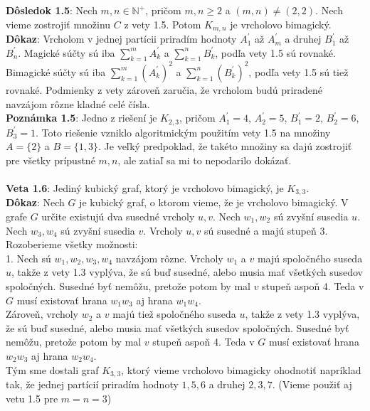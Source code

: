 \documentclass[12pt]{article}
\begin{document}
\textbf{Dôsledok 1.5}:  Nech $m,n \in \mathbb{N^+}$, pričom $m,n \geq 2$ a $(m, n) \neq (2, 2)$. Nech vieme zostrojiť množinu $C$ z vety 1.5. Potom $K _{m,n}$ je vrcholovo bimagický. \\

\textbf{Dôkaz}: Vrcholom v jednej partícii priradím hodnoty $A^\prime_1$ až $A^\prime_m$ a druhej $B^\prime_1$ až $B^\prime_n$. Magické súčty sú iba $\sum_{k=1}^{m} A^\prime_k$ a $\sum_{k=1}^{n} B^\prime_k$, podľa vety 1.5 sú rovnaké. Bimagické súčty sú iba $\sum_{k=1}^{m} (A^\prime_k)^2$ a $\sum_{k=1}^{n} (B^\prime_k)^2$, podľa vety 1.5 sú tiež rovnaké. Podmienky z vety zároveň zaručia, že vrcholom budú priradené navzájom rôzne kladné celé čísla. \\

\textbf{Poznámka 1.5}: Jedno z riešení je $K _{2,3}$, pričom $A^\prime_1 = 4$, $A^\prime_2 = 5$, $B^\prime_1 = 2$, $B^\prime_2 = 6$, $B^\prime_3 = 1$. Toto riešenie vzniklo algoritmickým použitím vety 1.5 na množiny $A = \{2\}$ a $B = \{1,3\}$. Je veľký predpoklad, že takéto množiny sa dajú zostrojiť pre všetky prípustné $m,n$, ale zatiaľ sa mi to nepodarilo dokázať. \\\\

\textbf{Veta 1.6}: Jediný kubický graf, ktorý je vrcholovo bimagický, je $K_{3,3}$. \\

\textbf{Dôkaz}: Nech $G$ je kubický graf, o ktorom vieme, že je vrcholovo bimagický. V grafe $G$ určite existujú dva susedné vrcholy $u,v$. Nech $w_1, w_2$ sú zvyšní susedia $u$. Nech $w_3, w_4$ sú zvyšní susedia $v$. Vrcholy $u,v$ sú susedné a majú stupeň 3. Rozoberieme všetky možnosti: \\

1. Nech sú $w_1, w_2, w_3, w_4$ navzájom rôzne. Vrcholy $w_1$ a $v$ majú spoločného suseda $u$, takže z vety 1.3 vyplýva, že sú buď susedné, alebo musia mať všetkých susedov spoločných. Susedné byť nemôžu, pretože potom by mal $v$ stupeň aspoň 4. Teda v $G$ musí existovať hrana $w_1 w_3$ aj hrana $w_1 w_4$. \\

Zároveň, vrcholy $w_2$ a $v$ majú tiež spoločného suseda $u$, takže z vety 1.3 vyplýva, že sú buď susedné, alebo musia mať všetkých susedov spoločných. Susedné byť nemôžu, pretože potom by mal $v$ stupeň aspoň 4. Teda v $G$ musí existovať hrana $w_2 w_3$ aj hrana $w_2 w_4$. \\

Tým sme dostali graf $K_{3,3}$, ktorý vieme vrcholovo bimagicky ohodnotiť napríklad tak, že jednej partícií priradím hodnoty $1,5,6$ a druhej $2,3,7$. (Vieme použiť aj vetu 1.5 pre $m = n = 3$) \\\\
\end{document}

